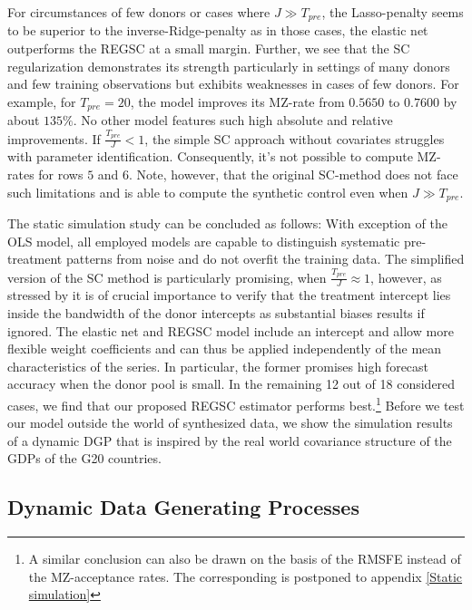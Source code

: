 For circumstances of few donors or cases where $J \gg T_{pre}$, the Lasso-penalty seems to be superior to the inverse-Ridge-penalty as in those cases, the elastic net outperforms the \ac{REGSC} at a small margin. Further, we see that the \ac{SC} regularization demonstrates its strength particularly in settings of many donors and few training observations but exhibits weaknesses in cases of few donors. For example, for $T_{pre} = 20$, the model improves its \ac{MZ}-rate from $0.5650$ to $0.7600$ by about $135\%$. No other model features such high absolute and relative improvements. If $\frac{T_{pre}}{J} < 1$, the simple \ac{SC} approach without covariates struggles with parameter identification. Consequently, it's not possible to compute \ac{MZ}-rates for rows $5$ and $6$. Note, however, that the original \ac{SC}-method does not face such limitations and is able to compute the synthetic control even when $J \gg T_{pre}$. 

The static simulation study can be concluded as follows: With exception of the OLS model, all employed models are capable to distinguish systematic pre-treatment patterns from noise and do not overfit the training data. The simplified version of the \ac{SC} method is particularly promising, when $\frac{T_{pre}}{J} \approx 1$, however, as stressed by \cite{abadie:2010} it is of crucial importance to verify that the treatment intercept lies inside the bandwidth of the donor intercepts as substantial biases results if ignored. The elastic net and \ac{REGSC} model include an intercept and allow more flexible weight coefficients and can thus be applied independently of the mean characteristics of the series. In particular, the former promises high forecast accuracy when the donor pool is small. In the remaining 12 out of 18 considered cases, we find that our proposed \ac{REGSC} estimator performs best.\footnote{A similar conclusion can also be drawn on the basis of the \ac{RMSFE} instead of the \ac{MZ}-acceptance rates. The corresponding is postponed to appendix \ref{Static simulation}}
Before we test our model outside the world of synthesized data, we show the simulation results of a dynamic \ac{DGP} that is inspired by the real world covariance structure of the \ac{GDP}s of the G20 countries.


\subsection{Dynamic Data Generating Processes}